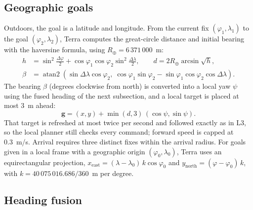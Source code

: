 \subsection{Geographic goals}

Outdoors, the goal is a latitude and longitude.
From the current fix $(\varphi_1, \lambda_1)$ to the goal $(\varphi_2, \lambda_2)$, Terra computes the great-circle distance and initial bearing with the haversine formula, using $R_\oplus = 6\,371\,000$~m:
\begin{align}
  h &= \sin^2\!\frac{\Delta\varphi}{2} + \cos\varphi_1 \cos\varphi_2 \sin^2\!\frac{\Delta\lambda}{2}, \qquad d = 2R_\oplus \arcsin\sqrt{h}, \\
  \beta &= \operatorname{atan2}\!\left(\sin\Delta\lambda \cos\varphi_2,\; \cos\varphi_1 \sin\varphi_2 - \sin\varphi_1 \cos\varphi_2 \cos\Delta\lambda\right).
\end{align}
The bearing $\beta$ (degrees clockwise from north) is converted into a local yaw $\psi$ using the fused heading of the next subsection, and a local target is placed at most 3~m ahead:
\begin{equation}
  \mathbf{g} = (x, y) + \min(d, 3)\,(\cos\psi, \sin\psi).
\end{equation}
That target is refreshed at most twice per second and followed exactly as in L3, so the local planner still checks every command; forward speed is capped at 0.3~m/s.
Arrival requires three distinct fixes within the arrival radius.
For goals given in a local frame with a geographic origin $(\varphi_0, \lambda_0)$, Terra uses an equirectangular projection, $x_{\text{east}} = (\lambda - \lambda_0)\,k\cos\varphi_0$ and $y_{\text{north}} = (\varphi - \varphi_0)\,k$, with $k = 40\,075\,016.686 / 360$~m per degree.

\subsection{Heading fusion}

